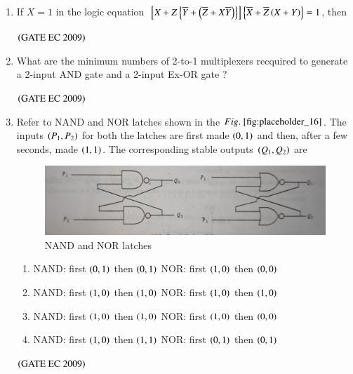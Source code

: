 \documentclass[journal,12pt,onecolumn]{IEEEtran}
\theoremstyle{remark}
\begin{document}
\begin{enumerate}
\item If $X=1$ in the logic equation $\sbrak{X + Z\cbrak{\overline{Y} + \brak{\overline{Z} + X\overline{Y}}}} \cbrak{\overline{X} + \overline{Z}\brak{X+Y}} = 1$, then
\begin{enumerate}
\end{enumerate}
\hfill $\brak{\text{GATE EC 2009}}$

\item What are the minimum numbers of 2-to-1 multiplexers recquired to generate a 2-input AND gate and a 2-input Ex-OR gate ?
\begin{enumerate}
\end{enumerate}
\hfill $\brak{\text{GATE EC 2009}}$

\item Refer to NAND and NOR latches shown in the $\figref{fig:placeholder_16}$. The inputs $\brak{P_1,P_2}$ for both the latches are first made $\brak{0,1}$ and then, after a few seconds, made $\brak{1,1}$. The corresponding stable outputs $\brak{Q_1, Q_2}$ are
\begin{figure}[H]
    \centering
    \includegraphics[width=0.5\columnwidth]{figs/fig_16.jpg}
    \caption{\centering NAND and NOR latches}
    \label{fig:placeholder_16}
\end{figure}
\begin{enumerate}
    \item NAND: first $\brak{0,1}$ then $\brak{0,1}$   NOR: first $\brak{1,0}$ then $\brak{0,0}$
    \item NAND: first $\brak{1,0}$ then $\brak{1,0}$   NOR: first $\brak{1,0}$ then $\brak{1,0}$
    \item NAND: first $\brak{1,0}$ then $\brak{1,0}$   NOR: first $\brak{1,0}$ then $\brak{0,0}$
    \item NAND: first $\brak{1,0}$ then $\brak{1,1}$   NOR: first $\brak{0,1}$ then $\brak{0,1}$
\end{enumerate}
\hfill $\brak{\text{GATE EC 2009}}$


\end{enumerate}
\end{document}
